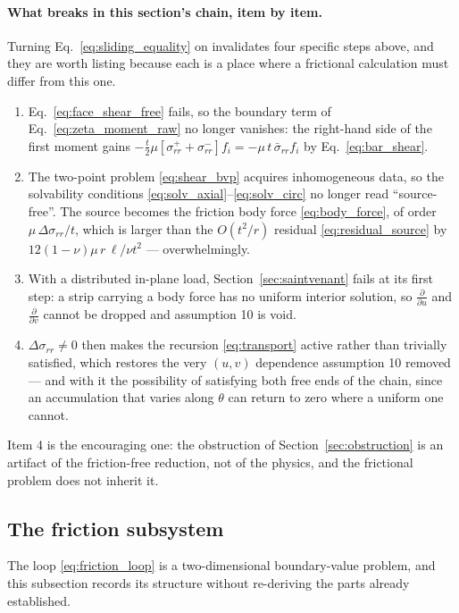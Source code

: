 \documentclass[11pt]{article}
\begin{document}
\paragraph{What breaks in this section's chain, item by item.} Turning
Eq.~\eqref{eq:sliding_equality} on invalidates four specific steps above, and
they are worth listing because each is a place where a frictional calculation
must differ from this one.
\begin{enumerate}
\item Eq.~\eqref{eq:face_shear_free} fails, so the boundary term of
  Eq.~\eqref{eq:zeta_moment_raw} no longer vanishes: the right-hand side of the
  first moment gains $-\tfrac{t}{2}\mu\left[\sigma_{rr}^{+}
  + \sigma_{rr}^{-}\right]f_i = -\mu\,t\,\bar\sigma_{rr}f_i$ by
  Eq.~\eqref{eq:bar_shear}.
\item The two-point problem \eqref{eq:shear_bvp} acquires inhomogeneous data, so
  the solvability conditions \eqref{eq:solv_axial}--\eqref{eq:solv_circ} no longer
  read ``source-free''. The source becomes the friction body force
  \eqref{eq:body_force}, of order $\mu\,\Delta\sigma_{rr}/t$, which is larger
  than the $O(t^{2}/r)$ residual \eqref{eq:residual_source} by
  $12\left(1-\nu\right)\mu\,r\,\ell/\nu t^{2}$ --- overwhelmingly.
\item With a distributed in-plane load, Section~\ref{sec:saintvenant} fails at
  its first step: a strip carrying a body force has no uniform interior
  solution, so $\frac{\partial}{\partial u}$ and $\frac{\partial}{\partial v}$
  cannot be dropped and assumption 10 is void.
\item $\Delta\sigma_{rr} \ne 0$ then makes the recursion \eqref{eq:transport}
  active rather than trivially satisfied, which restores the very
  $\left(u,v\right)$ dependence assumption 10 removed --- and with it the
  possibility of satisfying both free ends of the chain, since an accumulation
  that varies along $\theta$ can return to zero where a uniform one cannot.
\end{enumerate}
Item 4 is the encouraging one: the obstruction of
Section~\ref{sec:obstruction} is an artifact of the friction-free reduction,
not of the physics, and the frictional problem does not inherit it.

\subsection{The friction subsystem}\label{sec:friction_closure}
The loop \eqref{eq:friction_loop} is a two-dimensional boundary-value problem,
and this subsection records its structure without re-deriving the parts already
established.
\end{document}
